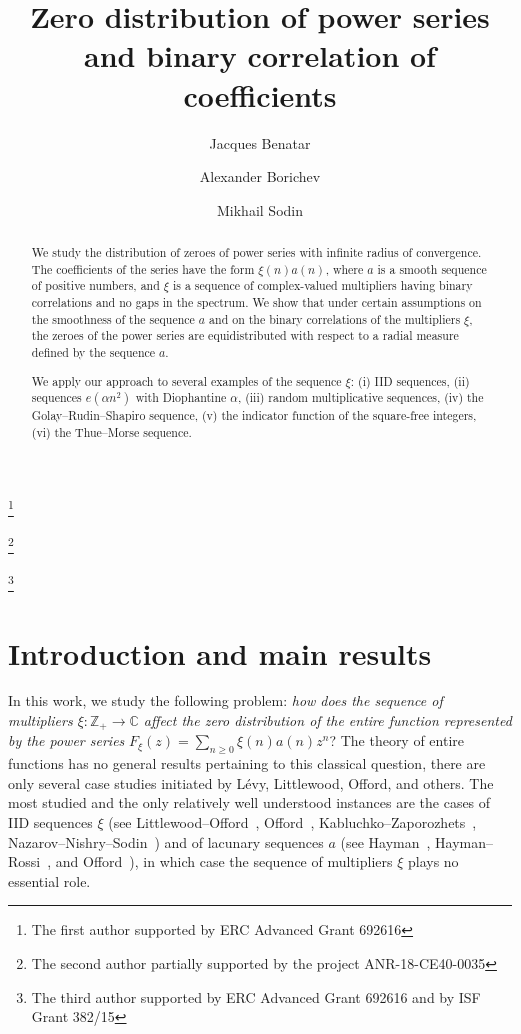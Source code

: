 \documentclass[11pt]{amsart}
\numberwithin{equation}{section}
\newcommand{\bC}{\mathbb C}
\newcommand{\bZ}{\mathbb Z}
\begin{document}
\title[Zero distribution of power series]{Zero distribution of power series and binary correlation of coefficients}



\author{Jacques Benatar} 
\thanks{The first author supported by ERC Advanced Grant 692616}   
\author{Alexander Borichev}
\thanks{The second author partially supported by the project ANR-18-CE40-0035}  
\author{Mikhail Sodin}
\thanks{The third author supported by ERC Advanced Grant 692616 and by ISF Grant 382/15} 

\begin{abstract}
We study
the distribution of zeroes of power series with infinite radius of convergence. 
The coefficients of the series have the form $\xi(n)a(n)$, where $a$
is a smooth sequence of positive numbers, and $\xi$ is a sequence of complex-valued
multipliers having binary correlations and no gaps in the spectrum.
We show that under certain assumptions on the smoothness of the sequence $a$ and on
the binary correlations of the multipliers $\xi$, the zeroes of the power series
are equidistributed with respect to a radial measure defined by the sequence $a$.

We apply our approach to several examples of the sequence $\xi$:
(i) IID sequences,
(ii) sequences $e(\alpha n^2)$ with Diophantine $\alpha$,
(iii) random multiplicative sequences, (iv) the Golay--Rudin--Shapiro sequence,
(v) the indicator function of the square-free integers, (vi) the Thue--Morse sequence.
\end{abstract}

\maketitle




\section{Introduction and main results}
In this work, we study the
following problem: {\em how does the sequence of multipliers $\xi\colon \bZ_+\to\bC$
affect the zero distribution of the entire function represented by the
power series} $F_\xi(z) = \sum_{n\ge 0} \xi (n) a(n) z^n$?
The theory of entire functions has no general results pertaining to this classical
question, there are only several case studies initiated by L\'evy, Littlewood, Offord,
and others. The most studied and the only relatively well understood instances
are the cases of IID sequences $\xi$ (see Littlewood--Offord~\cite{LO}, Offord~\cite{Off-Rand1, Off-Rand2}, Kabluchko--Zaporozhets~\cite{KZ}, Nazarov--Nishry--Sodin~\cite{NNS}) and of
lacunary sequences $a$ (see Hayman~\cite{Hayman}, Hayman--Rossi~\cite{HR}, and Offord~\cite{Off-Lac1, Off-Lac2}), in which case the sequence of multipliers $\xi$ plays no essential role.
\end{document}
